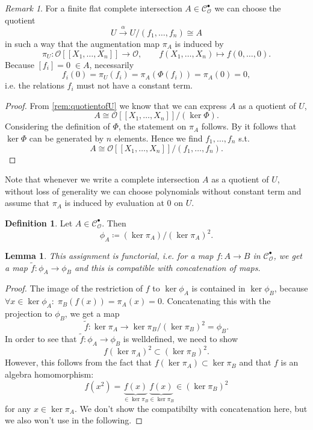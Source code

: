 \documentclass{article}
\theoremstyle{plain}%
\newtheorem{lemma}[theorem]{Lemma}
\theoremstyle{definition}
\newtheorem{definition}[theorem]{Definition}
\theoremstyle{remark}
\newtheorem{remark}[theorem]{Remark}
\newcommand{\cob}{\mathcal{C}_\mathcal{O}^\bullet}
\begin{document}
\begin{remark}\label{rem:noconstant}
    For a finite flat complete intersection \(A \in \cob\) we can choose the quotient
    \[
        U \xrightarrow{\alpha} U/(f_1, \dots, f_n) \cong A  
    \]
    in such a way that the augmentation map \(\pi_A\) is induced by 
    \[
        \pi_U\colon \mathcal{O}[[X_1, \dots, X_n]] \to \mathcal{O},\qquad f(X_1, \dots, X_n) \mapsto f(0,\dots, 0).  
    \]
    Because \([f_i] = 0 \; \in A\), necessarily
    \[
        f_i(0) = \pi_U(f_i) = \pi_A(\Phi(f_i)) = \pi_A(0) = 0,  
    \]
    i.e. the relations \(f_i\) must not have a constant term.
\end{remark}
\begin{proof}
    From \cref{rem:quotientofU} we know that we can express \(A\) as a quotient of \(U\),
    \[
        A \cong \mathcal{O}[[X_1, \dots, X_n]]/(\ker \Phi).
    \]
    Considering the definition of \(\Phi\), the statement on \(\pi_A\) follows.
    By \cite[theorem 21.2]{Matsumura1986} it follows that \(\ker \Phi\) can be generated by \(n\) elements.
    Hence we find \(f_1, \dots, f_n\) s.t.
    \[
        A \cong \mathcal{O}[[X_1, \dots, X_n]]/(f_1, \dots, f_n).
    \]
\end{proof}
Note that whenever we write a complete intersection \(A\) as a quotient of \(U\), without loss of generality
we can choose polynomials without constant term and assume that \(\pi_A\) is induced by evaluation at 0 on \(U\).

\begin{definition}
    Let \(A \in \cob\). Then
    \[\phi_A \coloneqq (\ker \pi_A)/(\ker \pi_A)^2.\]
\end{definition}
\begin{lemma}\label{lem:functoriality_phi}
    This assignment is functorial, i.e. for a map \(f\colon A \to B\) in \(\cob\),
    we get a map \(\tilde f\colon \phi_A \to \phi_B\) and this is compatible with
    concatenation of maps.
\end{lemma}
\begin{proof}
    The image of the restriction of \(f\) to \(\ker \phi_A\) is contained in \(\ker \phi_B\), 
    because \(\forall x \in \ker \phi_A\colon\; \pi_B(f(x)) = \pi_A(x) = 0\).
    Concatenating this with the projection to \(\phi_B\), we get a map
    \[
        \tilde f\colon \ker \pi_A \to \ker \pi_B/(\ker \pi_B)^2 = \phi_B.
    \]
    In order to see that \(\tilde f\colon \phi_A \to \phi_B\) is welldefined, we need to show 
    \[
        f(\ker \pi_A)^2 \subset (\ker \pi_B)^2.
    \]
    However, this follows from the fact that \(f(\ker \pi_A) \subset \ker \pi_B\) and that \(f\) is an algebra
    homomorphism:
    \[
        f(x^2) = \underbrace{f(x)}_{\in \ker \pi_B}\underbrace{f(x)}_{\in \ker \pi_B} \in (\ker \pi_B)^2 
    \]
    for any \(x \in \ker \pi_A\).
    We don't show the compatibilty with concatenation here, but we also won't use in the following.
\end{proof}
\end{document}
